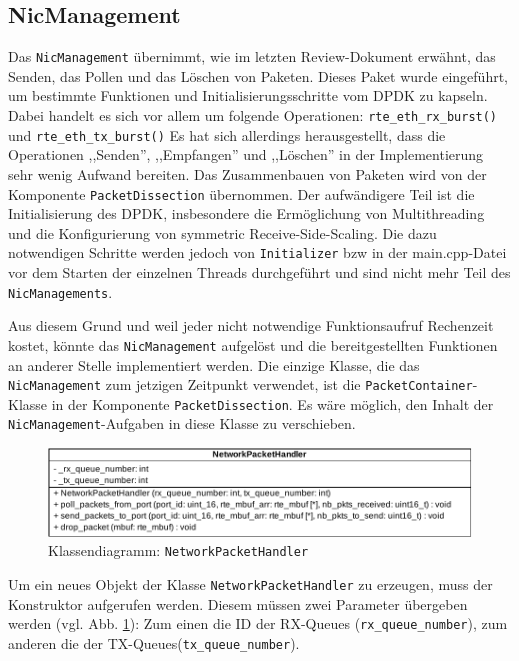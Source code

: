 \documentclass[../review_3.tex]{subfiles}
\begin{document}
\subsection{NicManagement}
Das \texttt{NicManagement} übernimmt, wie im letzten Review-Dokument erwähnt, das Senden, das Pollen und das Löschen von Paketen. Dieses Paket wurde eingeführt, um bestimmte Funktionen und Initialisierungsschritte vom DPDK zu kapseln. Dabei handelt es sich vor allem um folgende Operationen: \texttt{rte\_eth\_rx\_burst()} und \texttt{rte\_eth\_tx\_burst()} Es hat sich allerdings herausgestellt, dass die Operationen ,,Senden'', ,,Empfangen'' und ,,Löschen'' in der Implementierung sehr wenig Aufwand bereiten. Das Zusammenbauen von Paketen wird von der Komponente \texttt{PacketDissection} übernommen. Der aufwändigere Teil ist die Initialisierung des DPDK, insbesondere die Ermöglichung von Multithreading und die Konfigurierung von symmetric Receive-Side-Scaling. Die dazu notwendigen Schritte werden jedoch von \texttt{Initializer} bzw in der main.cpp-Datei vor dem Starten der einzelnen Threads durchgeführt und sind nicht mehr Teil des \texttt{NicManagements}.

Aus diesem Grund und weil jeder nicht notwendige Funktionsaufruf Rechenzeit kostet, könnte das \texttt{NicManagement} aufgelöst und die bereitgestellten Funktionen an anderer Stelle implementiert werden. Die einzige Klasse, die das \texttt{NicManagement} zum jetzigen Zeitpunkt verwendet, ist die \texttt{PacketContainer}-Klasse in der Komponente \texttt{PacketDissection}. Es wäre möglich, den Inhalt der \texttt{NicManagement}-Aufgaben in diese Klasse zu verschieben.

\begin{figure}[h]
    \centering
    \includegraphics[width=\linewidth]{img/NetworkPacketHandler.pdf}
    \caption{Klassendiagramm: \texttt{NetworkPacketHandler}}
    \label{nph}
\end{figure}

Um ein neues Objekt der Klasse \texttt{NetworkPacketHandler} zu erzeugen, muss der Konstruktor aufgerufen werden. Diesem müssen zwei Parameter übergeben werden (vgl. Abb. \ref{nph}): Zum einen die ID der RX-Queues (\texttt{rx\_queue\_number}), zum anderen die der TX-Queues(\texttt{tx\_queue\_number}).
\end{document}
